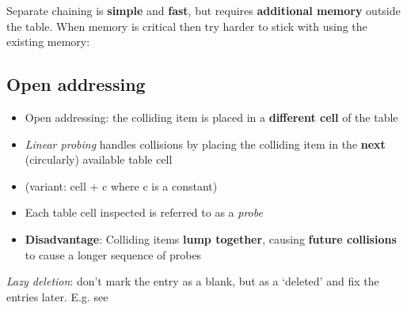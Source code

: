 \documentclass{article}
\begin{document}
\begin{flushleft}
Separate chaining is \textbf{simple} and \textbf{fast}, but requires \textbf{additional memory} outside the table.	When memory is critical then try harder to stick with using the existing memory:
\end{flushleft}

\subsection{Open addressing}
\begin{itemize}
	\item Open addressing: the colliding item is placed in a \textbf{different cell} of the table
	\item \textit{Linear probing} handles collisions by placing the colliding item in the \textbf{next} (circularly) available table cell
	\item (variant: cell + c where c is a constant)
	\item Each table cell inspected is referred to as a \textit{probe}
	\item \textbf{Disadvantage}: Colliding items \textbf{lump together}, causing \textbf{future collisions} to cause a longer sequence of probes
\end{itemize}
\begin{flushleft}
\textit{Lazy deletion}: don’t mark the entry as a blank, but as a ‘deleted’ and fix the entries later. E.g. see
\end{flushleft}

\pagebreak
\end{document}
